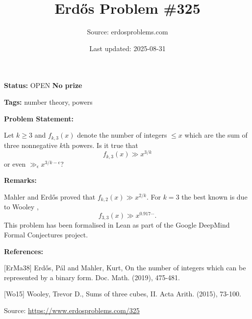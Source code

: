 \documentclass{article}
\title{Erd\H{o}s Problem \#325}
\date{Last updated: 2025-08-31}
\author{Source: erdosproblems.com}
\begin{document}
\maketitle

\noindent\textbf{Status:} OPEN \quad \textbf{No prize}

\noindent\textbf{Tags:} number theory, powers

\medskip
\noindent\textbf{Problem Statement:}

Let $k\geq 3$ and $f_{k,3}(x)$ denote the number of integers $\leq x$ which are the sum of three nonnegative $k$th powers. Is it true that\[f_{k,3}(x) \gg x^{3/k}\]or even $\gg_\epsilon x^{3/k-\epsilon}$?

\bigskip
\noindent\textbf{Remarks:}

Mahler and Erd\H{o}s \cite{ErMa38} proved that $f_{k,2}(x) \gg x^{2/k}$. For $k=3$ the best known is due to Wooley \cite{Wo15},\[f_{3,3}(x) \gg x^{0.917\cdots}.\]This problem has been formalised in Lean as part of the Google DeepMind Formal Conjectures project.

\bigskip
\noindent\textbf{References:}

[ErMa38] Erd\H{o}s, P\'{a}l and Mahler, Kurt, On the number of integers which can be represented by a binary form. Doc. Math. (2019), 475-481.
 
 [Wo15] Wooley, Trevor D., Sums of three cubes, II. Acta Arith. (2015), 73-100.

\bigskip
\noindent\small{Source: \url{https://www.erdosproblems.com/325}}
\end{document}
